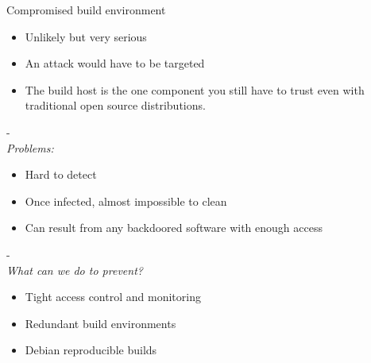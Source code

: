 \documentclass[11pt]{beamer}
\begin{document}
\begin{frame}{Compromised build environment}
\begin{itemize}
\item Unlikely but very serious\\
\item An attack would have to be targeted\\ %
\item The build host is the one component you still have to trust even with traditional open source distributions. %
\end{itemize}
-\\
\pause
\emph{Problems:}
\begin{itemize}
\item Hard to detect
\item Once infected, almost impossible to clean
\item Can result from any backdoored software with enough access
\end{itemize}
-\\
\pause
\emph{What can we do to prevent?}
\begin{itemize}
\item Tight access control and monitoring
\item Redundant build environments  
\item Debian reproducible builds    
\end{itemize}
\end{frame}
\end{document}
